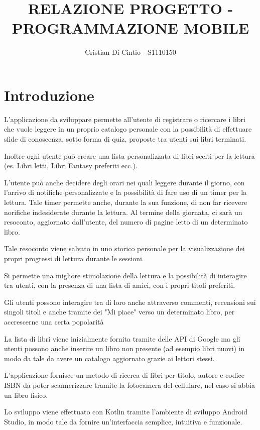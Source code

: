 \documentclass{article}
\author{Cristian Di Cintio - S1110150}
\title{RELAZIONE PROGETTO - PROGRAMMAZIONE MOBILE}
\begin{document}
\maketitle
\tableofcontents
\newpage

\section{Introduzione}

L'applicazione da sviluppare permette all'utente di registrare o ricercare i libri che vuole leggere in un proprio catalogo personale con la possibilità di effettuare sfide di conoscenza, sotto forma di quiz, proposte tra utenti sui libri terminati.

Inoltre ogni utente può creare una lista personalizzata di libri scelti per la lettura (es. Libri letti, Libri Fantasy preferiti ecc.).

L'utente può anche decidere degli orari nei quali leggere durante il giorno, con l'arrivo di notifiche personalizzate e la possibilità di fare uso di un timer per la lettura. Tale timer permette anche, durante la sua funzione, di non far ricevere norifiche indesiderate durante la lettura. Al termine della giornata, ci sarà un resoconto, aggiornato dall'utente, del numero di pagine letto di un determinato libro.

Tale resoconto viene salvato in uno storico personale per la visualizzazione dei propri progressi di lettura durante le sessioni.

Si permette una migliore stimolazione della lettura e la possibilità di interagire tra utenti, con la presenza di una lista di amici, con i propri titoli preferiti.

Gli utenti possono interagire tra di loro anche attraverso commenti, recensioni sui singoli titoli e anche tramite dei "Mi piace" verso un determinato libro, per accrescerne una certa popolarità

La lista di libri viene inizialmente fornita tramite delle API di Google ma gli utenti possono anche inserire un libro non presente (ad esempio libri nuovi) in modo da tale da avere un catalogo aggiornato grazie ai lettori stessi.

L'applicazione fornisce un metodo di ricerca di libri per titolo, autore e codice ISBN da poter scannerizzare tramite la fotocamera del cellulare, nel caso si abbia un libro fisico.

Lo sviluppo viene effettuato con Kotlin tramite l'ambiente di sviluppo Android Studio, in modo tale da fornire un'interfaccia semplice, intuitiva e funzionale.
\end{document}
